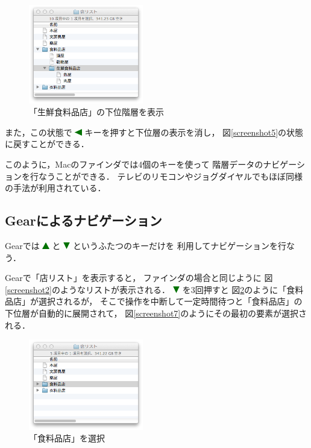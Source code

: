 \documentclass[twoside]{wiss}
\def\GEAR{\textsf{Gear}}
\def\figwidth{50mm}
\def\up{ \includegraphics[width=3mm,bb=0 0 36 36]{figures/uptriangle.pdf} }
\def\down{ \includegraphics[width=3mm,bb=0 0 36 36]{figures/downtriangle.pdf} }
\def\left{ \includegraphics[width=3mm,bb=0 0 36 36]{figures/lefttriangle.pdf} }
\begin{document}
\begin{figure}[H]
\centerline{\includegraphics[width=\figwidth,bb=0 0 344 298]{figures/ce3ee682612de44d6c663a7323c262a6.png}}
\caption{「生鮮食料品店」の下位階層を表示}
\label{screenshot6}
\end{figure}

\noindent
また，この状態で{\left}キーを押すと下位層の表示を消し，
図\ref{screenshot5}の状態に戻すことができる．

このように，Macのファインダでは4個のキーを使って
階層データのナビゲーションを行なうことができる．
テレビのリモコンやジョグダイヤルでもほぼ同様の手法が利用されている．

\subsection{{\GEAR}によるナビゲーション}

{\GEAR}では{\up}と{\down}というふたつのキーだけを
利用してナビゲーションを行なう．

{\GEAR}で「店リスト」を表示すると，
ファインダの場合と同じように
図\ref{screenshot2}のようなリストが表示される．
{\down}を3回押すと
図\ref{screenshot42}のように「食料品店」が選択されるが，
そこで操作を中断して一定時間待つと「食料品店」の下位層が自動的に展開されて，
図\ref{screenshot7}のようにその最初の要素が選択される．

\begin{figure}[H]
\centerline{\includegraphics[width=\figwidth,bb=0 0 344 272]{figures/c074cd6daec3da0341125d1492b8a09c.png}}
\caption{「食料品店」を選択}
\label{screenshot42}
\end{figure}
\end{document}
